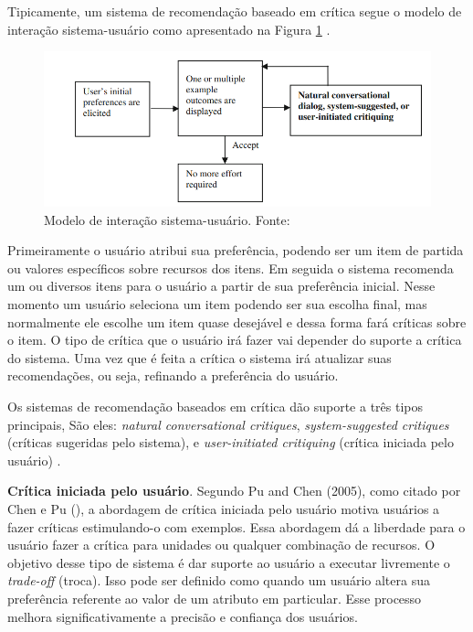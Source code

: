 Tipicamente, um sistema de recomendação baseado em crítica segue o modelo de interação sistema-usuário como apresentado na Figura \ref{fig:sistema_usuario} \cite{Chen:2012}.

\begin{figure}[H]
    \centering
    \includegraphics[scale=0.45]{figuras/referencial_teorico/sistema_usuario.png}
    \caption[Modelo de interação sistema-usuário]{Modelo de interação sistema-usuário. Fonte: \cite{Chen:2012}}
    \label{fig:sistema_usuario}
\end{figure}

Primeiramente o usuário atribui sua preferência, podendo ser um item de partida ou valores específicos sobre recursos dos itens. Em seguida o sistema recomenda um ou diversos itens para o usuário a partir de sua preferência inicial. Nesse momento um usuário seleciona um item podendo ser sua escolha final, mas normalmente ele escolhe um item quase desejável e dessa forma fará críticas sobre o item. O tipo de crítica que o usuário irá fazer vai depender do suporte a crítica do sistema. Uma vez que é feita a crítica o sistema irá atualizar suas recomendações, ou seja, refinando a preferência do usuário.

Os sistemas de recomendação baseados em crítica dão suporte a três tipos principais, São eles: \textit{natural conversational critiques}, \textit{system-suggested critiques} (críticas sugeridas pelo sistema), e \textit{user-initiated critiquing} (crítica iniciada pelo usuário) \cite{Chen:2012}.

\textbf{Crítica iniciada pelo usuário}. Segundo Pu and Chen (2005), como citado por Chen e Pu (\citeyear{Chen:2012}), a abordagem de crítica iniciada pelo usuário motiva usuários a fazer críticas estimulando-o com exemplos. Essa abordagem dá a liberdade para o usuário fazer a crítica para unidades ou qualquer combinação de recursos. O objetivo desse tipo de sistema é dar suporte ao usuário a executar livremente o \textit{trade-off} (troca). Isso pode ser definido como quando um usuário altera sua preferência referente ao valor de um atributo em particular. Esse processo melhora significativamente a precisão e confiança dos usuários.

